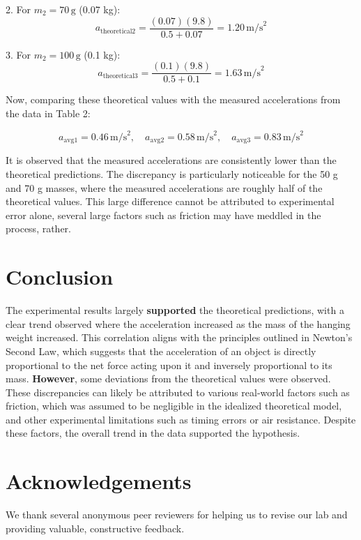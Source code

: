 ﻿\documentclass[reprint,amsmath,amssymb,aps]{revtex4-2}
\begin{document}
2. For \(m_2 = 70 \, \text{g}\) (0.07 kg):
\[
a_{\text{theoretical2}} = \frac{(0.07)(9.8)}{0.5 + 0.07} = 1.20 \, \text{m/s}^2
\]

3. For \(m_2 = 100 \, \text{g}\) (0.1 kg):
\[
a_{\text{theoretical3}} = \frac{(0.1)(9.8)}{0.5 + 0.1} = 1.63 \, \text{m/s}^2
\]

Now, comparing these theoretical values with the measured accelerations from the data in Table 2:

\[
a_{\text{avg1}} = 0.46 \, \text{m/s}^2, \quad a_{\text{avg2}} = 0.58 \, \text{m/s}^2, \quad a_{\text{avg3}} = 0.83 \, \text{m/s}^2
\]

It is observed that the measured accelerations are consistently lower than the theoretical predictions. The discrepancy is particularly noticeable for the 50 g and 70 g masses, where the measured accelerations are roughly half of the theoretical values. This large difference cannot be attributed to experimental error alone, several large factors such as friction may have meddled in the process, rather.






\section{Conclusion}
The experimental results largely \textbf{supported} the theoretical predictions, with a clear trend observed where the acceleration increased as the mass of the hanging weight increased. This correlation aligns with the principles outlined in Newton’s Second Law, which suggests that the acceleration of an object is directly proportional to the net force acting upon it and inversely proportional to its mass. \textbf{However}, some deviations from the theoretical values were observed. These discrepancies can likely be attributed to various real-world factors such as friction, which was assumed to be negligible in the idealized theoretical model, and other experimental limitations such as timing errors or air resistance. Despite these factors, the overall trend in the data supported the hypothesis.







\section{Acknowledgements}
We thank several anonymous peer reviewers for helping us to revise our lab and providing valuable, constructive feedback. 
\end{document}
